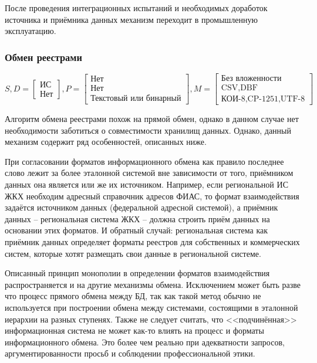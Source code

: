 После проведения интеграционных испытаний и необходимых доработок источника и приёмника данных механизм переходит в промышленную эксплуатацию.

\subsubsection{Обмен реестрами}

$$
S,D = \begin{bmatrix}
	\text{ИС} \\
	\text{Нет}
\end{bmatrix},
P = \begin{bmatrix}
	\text{Нет} \\
	\text{Нет} \\
	\text{Текстовый или бинарный}
\end{bmatrix},
M = \begin{bmatrix}
	\text{Без вложенности} \\
	\text{CSV,DBF} \\
	\text{КОИ-8,CP-1251,UTF-8}
\end{bmatrix}
$$

Алгоритм обмена реестрами похож на прямой обмен, однако в данном случае нет необходимости заботиться о совместимости хранилищ данных.
Однако, данный механизм содержит ряд особенностей, описанных ниже.

При согласовании форматов информационного обмена как правило последнее слово лежит за более эталонной системой вне зависимости от того, приёмником данных она является или же их источником.
Например, если региональной ИС ЖКХ необходим адресный справочник адресов ФИАС, то формат взаимодействия задаётся источником данных (федеральной адресной системой), а приёмник данных -- региональная система ЖКХ -- должна строить приём данных на основании этих форматов.
И обратный случай: региональная система как приёмник данных определяет форматы реестров для собственных и коммерческих систем, которые хотят размещать свои данные в региональной системе.

Описанный принцип монополии в определении форматов взаимодействия распространяется и на другие механизмы обмена.
Исключением может быть разве что процесс прямого обмена между БД, так как такой метод обычно не используется при построении обмена между системами, состоящими в эталонной иерархии на разных ступенях.
Также не следует считать, что <<подчинённая>> информационная система не может как-то влиять на процесс и форматы информационного обмена.
Это более чем реально при адекватности запросов, аргументированности просьб и соблюдении профессиональной этики.


